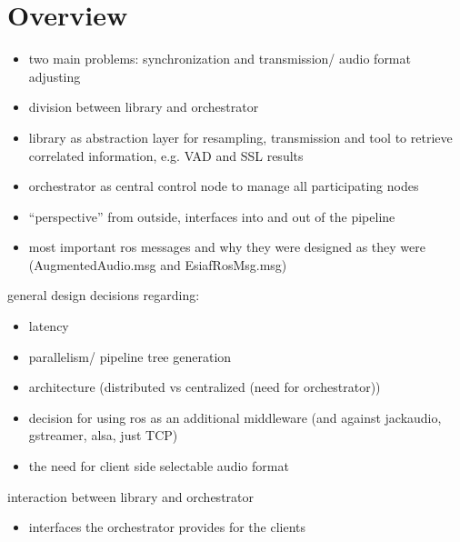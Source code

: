 

\chapter{Overview}

\begin{itemize}
	\item two main problems: synchronization and transmission/ audio format adjusting
	\item division between library and orchestrator
	\item library as abstraction layer for resampling, transmission and tool to retrieve correlated information, e.g. VAD and SSL results
	\item orchestrator as central control node to manage all participating nodes
	\item ``perspective'' from outside, interfaces into and out of the pipeline
	\item most important ros messages and why they were designed as they were (AugmentedAudio.msg and EsiafRosMsg.msg)
\end{itemize}

general design decisions regarding:

\begin{itemize}
	\item latency
	\item parallelism/ pipeline tree generation
	\item architecture (distributed vs centralized (need for orchestrator))
	\item decision for using ros as an additional middleware (and against jackaudio, gstreamer, alsa, just TCP)
	\item the need for client side selectable audio format 
\end{itemize}

interaction between library and orchestrator

\begin{itemize}
	\item interfaces the orchestrator provides for the clients
\end{itemize}